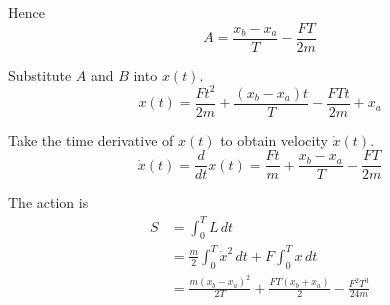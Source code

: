 Hence
\begin{equation*}
A=\frac{x_b-x_a}{T}-\frac{FT}{2m}
\end{equation*}

Substitute $A$ and $B$ into $x(t)$.
\begin{equation*}
x(t)=\frac{Ft^2}{2m}+\frac{(x_b-x_a)t}{T}-\frac{FTt}{2m}+x_a
\tag{1}
\end{equation*}

Take the time derivative of $x(t)$ to obtain velocity $\dot x(t)$.
\begin{equation*}
\dot x(t)=\frac{d}{dt}x(t)=\frac{Ft}{m}+\frac{x_b-x_a}{T}-\frac{FT}{2m}
\tag{2}
\end{equation*}

The action is
\begin{align*}
S&=\int_0^TL\,dt
\\
&=\frac{m}{2}\int_0^T\dot x^2\,dt+F\int_0^Tx\,dt
\\
&=\frac{m(x_b-x_a)^2}{2T}+\frac{FT(x_b+x_a)}{2}-\frac{F^2T^3}{24m}
\tag{3}
\end{align*}


